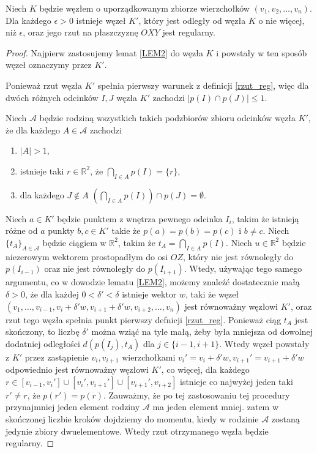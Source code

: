  
\begin{twierdzenie}
 Niech $K$ będzie węzłem o uporządkowanym zbiorze wierzchołków $(v_1, v_2, \ldots, v_n)$. Dla każdego $\epsilon > 0$ istnieje węzeł $K'$,
który jest odległy od węzła $K$ o nie więcej, niż $\epsilon$, oraz jego rzut na płaszczyznę $OXY$ jest regularny.
\end{twierdzenie}
\begin{proof}
 
Najpierw zastosujemy lemat \ref{LEM2} do węzła $K$ i powstały w ten sposób węzeł oznaczymy przez $K'$.
 
Ponieważ rzut węzła $K'$ spełnia pierwszy warunek z definicji \ref{rzut_reg}, więc dla dwóch różnych odcinków $I,J$ węzła
$K'$ zachodzi $|p(I)\cap p(J)| \le 1$.
 
Niech $\mathcal{A}$ będzie rodziną wszystkich takich podzbiorów zbioru odcinków węzła $K'$, że dla każdego $A\in\mathcal{A}$ zachodzi
\begin{enumerate}
 \item $|A| > 1$,
 \item istnieje taki $r\in\mathbb{R}^2$, że $\bigcap_{I\in A}p(I) = \lbrace r\rbrace$,
 \item dla każdego $J\not\in A$ $\left(\bigcap_{I\in A}p(I)\right)\cap p(J) = \emptyset$.
\end{enumerate}
 
Niech $a\in K'$ będzie punktem z wnętrza pewnego odcinka $I_i$, takim że istnieją różne od $a$ punkty $b, c\in K'$ takie że $p(a) = p(b) = p(c)$ i $b\neq c$.
Niech $\lbrace t_A\rbrace_{A\in\mathcal{A}}$ będzie ciągiem w $\mathbb{R}^2$, takim że $t_A = \bigcap_{I\in A}p(I)$. Niech $u\in\mathbb{R}^2$ będzie niezerowym wektorem prostopadłym do osi $OZ$, który
nie jest równoległy do $p(I_{i-1})$ oraz nie jest równoległy do $p(I_{i+1})$. Wtedy, używając tego samego argumentu, co w dowodzie lematu \ref{LEM2}, możemy znaleźć dostatecznie małą $\delta > 0$, że dla każdej $0 < \delta' < \delta$ istnieje wektor $w$, taki że
węzeł $(v_1, \ldots, v_{i-1}, v_i  + \delta'w, v_{i+1}  + \delta'w, v_{i+2}, \ldots, v_n)$ jest równoważny węzłowi $K'$, oraz rzut tego węzła spełnia punkt pierwszy
defnicji \ref{rzut_reg}. Ponieważ ciąg $t_A$ jest skończony, to
liczbę $\delta'$ można wziąć na tyle małą, żeby była mniejsza od dowolnej dodatniej odległości $d(p(I_j), t_A)$ dla $j \in \lbrace i-1, i+1\rbrace$.
Wtedy węzeł powstały z $K'$ przez zastąpienie $v_i, v_{i+1}$ wierzchołkami $v_i'=v_{i} + \delta'w, v_{i+1}'=v_{i+1}+\delta'w$
odpowiednio jest równoważny węzłowi $K'$, co więcej, dla każdego $r\in[v_{i-1}, v_i']\cup[v_i', v_{i+1}']\cup[v_{i+1}', v_{i+2}]$ istnieje co najwyżej jeden taki $r'\neq r$, że $p(r') = p(r)$.
Zauważmy, że po tej zastosowaniu tej procedury przynajmniej jeden element rodziny $\mathcal{A}$ ma jeden element mniej.
zatem w skończonej liczbie kroków dojdziemy do momentu, kiedy w rodzinie $\mathcal{A}$ zostaną jedynie zbiory dwuelementowe. Wtedy rzut otrzymanego węzła będzie regularny.
 
\end{proof}
 
